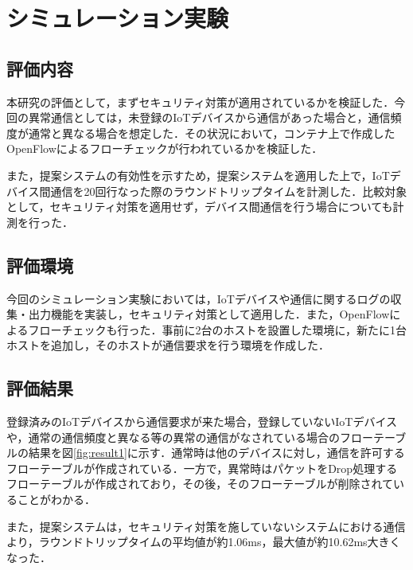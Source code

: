 \documentclass[a4paper,10pt,twocolumn,uplatex]{jsarticle}
\begin{document}
\section{シミュレーション実験}

\subsection{評価内容}
本研究の評価として，まずセキュリティ対策が適用されているかを検証した．今回の異常通信としては，未登録のIoTデバイスから通信があった場合と，通信頻度が通常と異なる場合を想定した．その状況において，コンテナ上で作成したOpenFlowによるフローチェックが行われているかを検証した．\par
また，提案システムの有効性を示すため，提案システムを適用した上で，IoTデバイス間通信を20回行なった際のラウンドトリップタイムを計測した．比較対象として，セキュリティ対策を適用せず，デバイス間通信を行う場合についても計測を行った．


\subsection{評価環境}
今回のシミュレーション実験においては，IoTデバイスや通信に関するログの収集・出力機能を実装し，セキュリティ対策として適用した．また，OpenFlowによるフローチェックも行った．事前に2台のホストを設置した環境に，新たに1台ホストを追加し，そのホストが通信要求を行う環境を作成した．


\subsection{評価結果}
登録済みのIoTデバイスから通信要求が来た場合，登録していないIoTデバイスや，通常の通信頻度と異なる等の異常の通信がなされている場合のフローテーブルの結果を図\ref{fig:result1}に示す．通常時は他のデバイスに対し，通信を許可するフローテーブルが作成されている．一方で，異常時はパケットをDrop処理するフローテーブルが作成されており，その後，そのフローテーブルが削除されていることがわかる．\par
また，提案システムは，セキュリティ対策を施していないシステムにおける通信より，ラウンドトリップタイムの平均値が約1.06ms，最大値が約10.62ms大きくなった．
\end{document}
